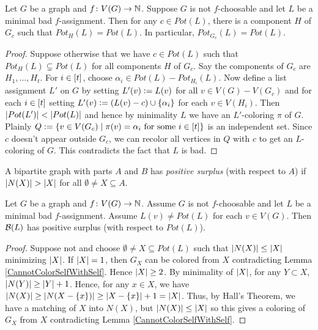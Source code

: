 \begin{lem}\label{ComponentsOfColor}
Let $G$ be a graph and $f\colon V(G) \rightarrow \mathbb{N}$.  
Suppose $G$ is not $f$-choosable and let $L$ be a minimal bad $f$-assignment.
Then for any $c \in Pot(L)$, there is a component $H$ of $G_c$ such that
$Pot_H(L) = Pot(L)$.  In particular, $Pot_{G_c}(L) = Pot(L)$.
\end{lem}
\begin{proof}
Suppose otherwise that we have $c \in Pot(L)$ such that $Pot_H(L) \subsetneq
Pot(L)$ for all components $H$ of $G_c$.  Say the components of $G_c$ are
$H_1, \ldots, H_t$. For $i \in \left[t\right]$, choose $\alpha_i \in Pot(L) -
Pot_{H_i}(L)$. Now define a list assignment $L'$ on $G$ by setting $L'(v)
\mathrel{\mathop:}= L(v)$ for all $v \in V(G) - V(G_c)$ and for each $i \in \left[t\right]$
setting $L'(v) \mathrel{\mathop:}= (L(v) - c) \cup \left\{ \alpha_i \right\}$ for each $v \in
V(H_i)$.  Then $\left|Pot(L')\right| < \left|Pot(L)\right|$ and hence by minimality $L$ we
have an $L'$-coloring $\pi$ of $G$.  Plainly $Q \mathrel{\mathop:}=
\left\{ v \in V(G_c) \mid \pi(v) = \alpha_i \text{ for some $i \in \left[t\right]$} \right\}$ is an
independent set.  Since $c$ doesn't appear outside $G_c$, we can recolor
all vertices in $Q$ with $c$ to get an $L$-coloring of $G$.  This contradicts
the fact that $L$ is bad.
\end{proof}

\begin{defn}
A bipartite graph with parts $A$ and $B$ has \emph{positive surplus} (with respect to $A$) if $\left|N(X)\right| > \left|X\right|$ for all $\emptyset \neq X \subseteq A$.
\end{defn}

\begin{lem}\label{MinPotCondition}
Let $G$ be a graph and $f\colon V(G) \rightarrow \mathbb{N}$.  Assume $G$ is not $f$-choosable and let $L$ be a minimal bad $f$-assignment. Assume $L(v) \neq Pot(L)$ for each $v \in V(G)$. Then $\mathcal{B}(L)$ has positive surplus (with respect to $Pot(L)$).
\end{lem}
\begin{proof}
Suppose not and choose $\emptyset \neq X \subseteq Pot(L)$ such that $\left|N(X)\right| \leq \left|X\right|$ minimizing $\left|X\right|$. If $\left|X\right| = 1$, then $G_X$ can be colored from $X$ contradicting Lemma \ref{CannotColorSelfWithSelf}.  Hence $\left|X\right| \geq 2$.  By minimality of $\left|X\right|$, for any $Y \subset X$,
$\left|N(Y)\right| \geq \left|Y\right| + 1$.  Hence, for any $x \in X$, we have $\left|N(X)\right| \geq \left|N(X - \left\{ x \right\})\right| \geq \left|X - \left\{ x \right\}\right| + 1 = \left|X\right|$.  Thus, by Hall's Theorem, we have a matching of $X$ into $N(X)$, but $\left|N(X)\right| \leq \left|X\right|$ so this gives a coloring of $G_X$ from $X$ contradicting Lemma \ref{CannotColorSelfWithSelf}.
\end{proof}

